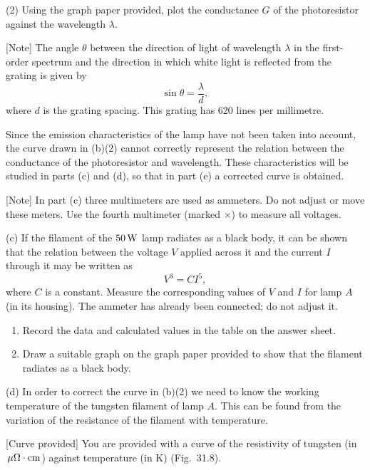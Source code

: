 (2) Using the graph paper provided, plot the conductance $G$ of the photoresistor against the wavelength $\lambda$.

[Note] The angle $\theta$ between the direction of light of wavelength $\lambda$ in the first-order spectrum and the direction in which white light is reflected from the grating is given by
\begin{equation*}
\sin\theta=\frac{\lambda}{d},
\end{equation*}
where $d$ is the grating spacing. This grating has 620 lines per millimetre.

Since the emission characteristics of the lamp have not been taken into account, the curve drawn in (b)(2) cannot correctly represent the relation between the conductance of the photoresistor and wavelength. These characteristics will be studied in parts (c) and (d), so that in part (e) a corrected curve is obtained.

[Note] In part (c) three multimeters are used as ammeters. Do not adjust or move these meters. Use the fourth multimeter (marked $\times$) to measure all voltages.

(c) If the filament of the $50\,\mathrm{W}$ lamp radiates as a black body, it can be shown that the relation between the voltage $V$ applied across it and the current $I$ through it may be written as
\begin{equation*}
V^3=CI^5 ,
\end{equation*}
where $C$ is a constant. Measure the corresponding values of $V$ and $I$ for lamp $A$ (in its housing). The ammeter has already been connected; do not adjust it.

\begin{enumerate}
\item[(1)] Record the data and calculated values in the table on the answer sheet.
\item[(2)] Draw a suitable graph on the graph paper provided to show that the filament radiates as a black body.
\end{enumerate}

(d) In order to correct the curve in (b)(2) we need to know the working temperature of the tungsten filament of lamp $A$. This can be found from the variation of the resistance of the filament with temperature.

[Curve provided] You are provided with a curve of the resistivity of tungsten (in $\,\mathrm{\mu\Omega\cdot cm}$) against temperature (in K) (Fig.~31.8).

